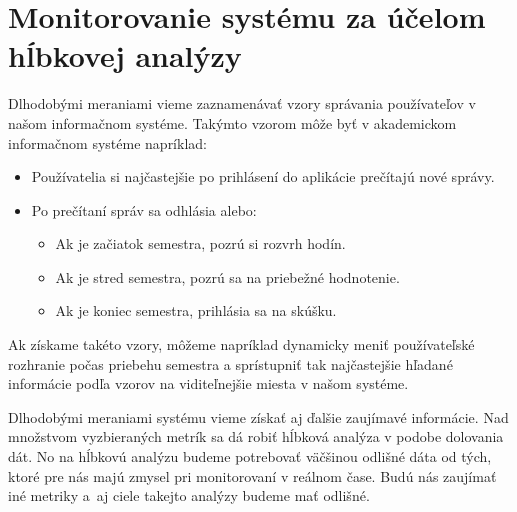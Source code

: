 \documentclass[a4paper, upjsfrontpage, disablespecwarning, thesismargins, thesislinespacing]{rnthesis}
\begin{document}

\section{Monitorovanie systému za účelom hĺbkovej analýzy}

Dlhodobými meraniami vieme zaznamenávať vzory správania používateľov v našom informačnom systéme.
Takýmto vzorom môže byť v akademickom informačnom systéme napríklad:

\begin{itemize}
	\item Používatelia si najčastejšie po prihlásení do aplikácie prečítajú nové správy.
	\item Po prečítaní správ sa odhlásia alebo:
	\begin{itemize}
		\item Ak je začiatok semestra, pozrú si rozvrh hodín.
		\item Ak je stred semestra, pozrú sa na priebežné hodnotenie.
		\item Ak je koniec semestra, prihlásia sa na skúšku.
	\end{itemize}
\end{itemize}

Ak získame takéto vzory, môžeme napríklad dynamicky meniť používateľské rozhranie počas priebehu semestra a sprístupniť tak najčastejšie hľadané informácie podľa vzorov na viditeľnejšie miesta v našom systéme.

Dlhodobými meraniami systému vieme získať aj ďalšie zaujímavé informácie.
Nad množstvom vyzbieraných metrík sa dá robiť hĺbková analýza v podobe dolovania dát.
No na hĺbkovú analýzu budeme potrebovať väčšinou odlišné dáta od tých, ktoré pre nás majú zmysel pri monitorovaní v reálnom čase.
Budú nás zaujímať iné metriky a~aj ciele takejto analýzy budeme mať odlišné.

\newpage


\end{document}
